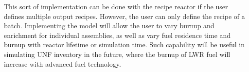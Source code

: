 This sort of implementation can be done with
the recipe reactor if the user defines multiple
output recipes. However, the user can only define
the recipe of a batch.
Implementing the model will allow the user to vary
burnup and enrichment for individual assemblies, as well
as vary fuel residence time and burnup with reactor
lifetime or simulation time. Such capability will be
useful in simulating \gls{UNF} inventory in the future,
where the burnup of \gls{LWR} fuel will increase
with advanced fuel technology.

